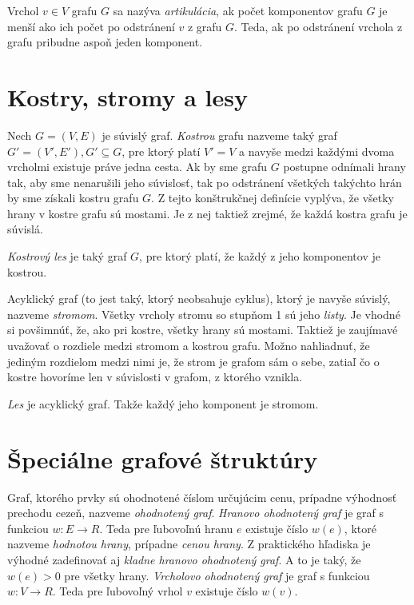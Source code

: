 Vrchol $v \in V$ grafu $G$ sa nazýva \textit{artikulácia}, ak počet komponentov grafu $G$ je menší ako ich počet po odstránení $v$ z grafu $G$. Teda, ak po odstránení vrchola z grafu pribudne aspoň jeden komponent.\newline


\section{Kostry, stromy a lesy}

Nech $G = (V, E)$ je súvislý graf. \textit{Kostrou} grafu nazveme taký graf $G' = (V', E'), G'\subseteq G$, pre ktorý platí $V' = V$ a navyše medzi každými dvoma vrcholmi existuje práve jedna cesta. Ak by sme grafu $G$ postupne odnímali hrany tak, aby sme nenarušili jeho súvislosť, tak po odstránení všetkých takýchto hrán by sme získali kostru grafu $G$. Z tejto konštrukčnej definície vyplýva, že všetky hrany v kostre grafu sú mostami. Je z nej taktiež zrejmé, že každá kostra grafu je súvislá.\newline

\textit{Kostrový les} je taký graf $G$, pre ktorý platí, že každý z jeho komponentov je kostrou.\newline

Acyklický graf (to jest taký, ktorý neobsahuje cyklus), ktorý je navyše súvislý, nazveme \textit{stromom}. Všetky vrcholy stromu so stupňom 1 sú jeho \textit{listy}. Je vhodné si povšimnúť, že, ako pri kostre, všetky hrany sú mostami. Taktiež je zaujímavé uvažovať o rozdiele medzi stromom a kostrou grafu. Možno nahliadnuť, že jediným rozdielom medzi nimi je, že strom je grafom sám o sebe, zatiaľ čo o kostre hovoríme len v súvislosti v grafom, z ktorého vznikla.\newline

\textit{Les} je acyklický graf. Takže každý jeho komponent je stromom.\newline


\section{Špeciálne grafové štruktúry}

Graf, ktorého prvky sú ohodnotené číslom určujúcim cenu, prípadne výhodnosť prechodu cezeň, nazveme \textit{ohodnotený graf}. \textit{Hranovo ohodnotený graf} je graf s funkciou $w: E\rightarrow R$. Teda pre ľubovoľnú hranu $e$ existuje číslo $w(e)$, ktoré nazveme \textit{hodnotou hrany}, prípadne \textit{cenou hrany}.  Z praktického hľadiska je výhodné zadefinovať aj \textit{kladne hranovo ohodnotený graf}. A to je taký, že $w(e) > 0$ pre všetky hrany. \textit{Vrcholovo ohodnotený graf} je graf s funkciou $w: V\rightarrow R$. Teda pre ľubovoľný vrhol $v$ existuje číslo $w(v)$. \newline

